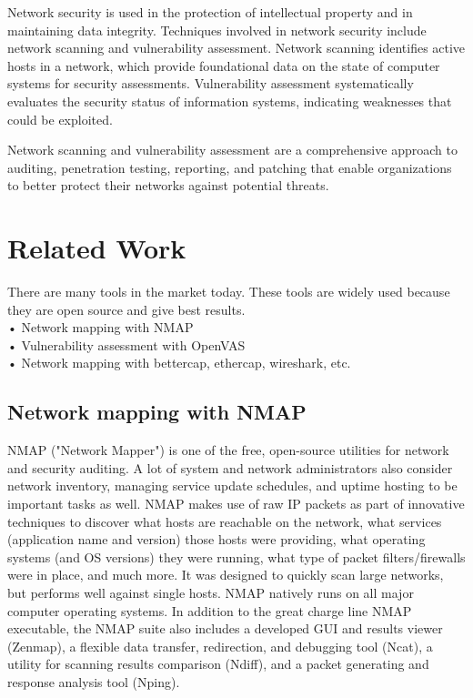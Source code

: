 \documentclass[conference]{IEEEtran}
\begin{document}
Network security is used in the protection of intellectual property and in maintaining data integrity. Techniques involved in network security include network scanning and vulnerability assessment. Network scanning identifies active hosts in a network, which provide foundational data on the state of computer systems for security assessments. Vulnerability assessment systematically evaluates the security status of information systems, indicating weaknesses that could be exploited.

Network scanning and vulnerability assessment are a comprehensive approach to auditing, penetration testing, reporting, and patching that enable organizations to better protect their networks against potential threats.

\section{Related Work}
There are many tools in the market today. These tools are widely used because they are open source and give best results.
\\• Network mapping with NMAP
\\• Vulnerability assessment with OpenVAS
\\• Network mapping with bettercap, ethercap, wireshark, etc.


\subsection{Network mapping with NMAP}
NMAP ("Network Mapper") is one of the free, open-source utilities for network and security auditing. A lot of system and network administrators also consider network inventory, managing service update schedules, and uptime hosting to be important tasks as well. NMAP makes use of raw IP packets as part of innovative techniques to discover what hosts are reachable on the network, what services (application name and version) those hosts were providing, what operating systems (and OS versions) they were running, what type of packet filters/firewalls were in place, and much more. It was designed to quickly scan large networks, but performs well against single hosts. NMAP natively runs on all major computer operating systems. In addition to the great charge line NMAP executable, the NMAP suite also includes a developed GUI and results viewer (Zenmap), a flexible data transfer, redirection, and debugging tool (Ncat), a utility for scanning results comparison (Ndiff), and a packet generating and response analysis tool (Nping).
\end{document}
